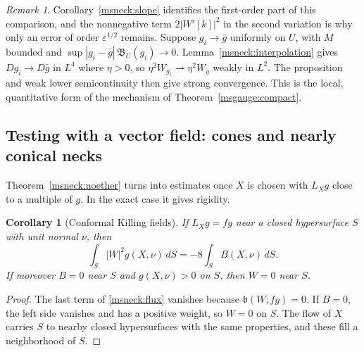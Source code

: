 \documentclass[11pt]{article}
\numberwithin{equation}{section}
\newtheorem{corollary}[theorem]{Corollary}
\theoremstyle{definition}
\theoremstyle{remark}
\newtheorem{remark}[theorem]{Remark}
\begin{document}
\begin{remark}\label{msneck:comparison-remark}
Corollary~\ref{msneck:slope} identifies the first-order part of this
comparison, and the nonnegative term \(2|W'[k]|^2\) in the second
variation is why only an error of order \(\varepsilon^{1/2}\) remains.
Suppose \(g_i\to\bar g\) uniformly on \(U\), with \(M\) bounded and
\(\sup|g_i-\bar g|\,\mathfrak B_U(g_i)\to0\). Lemma~\ref{msneck:interpolation}
gives \(Dg_i\to D\bar g\) in \(L^4\) where \(\eta>0\), so
\(\eta^2W_{g_i}\rightharpoonup\eta^2W_{\bar g}\) weakly in \(L^2\). The
proposition and weak lower semicontinuity then give strong convergence.
This is the local, quantitative form of the mechanism of
Theorem~\ref{msgauge:compact}.
\end{remark}

\subsection{Testing with a vector field: cones and nearly conical necks}
\label{msneck:conical}

Theorem~\ref{msneck:noether} turns into estimates once \(X\) is chosen
with \(L_Xg\) close to a multiple of \(g\). In the exact case it gives
rigidity.

\begin{corollary}[Conformal Killing fields]\label{msneck:ck}
If \(L_Xg=fg\) near a closed hypersurface \(S\) with unit normal \(\nu\),
then
\[
 \int_S|W|^2g(X,\nu)\,dS=-8\int_SB(X,\nu)\,dS .
\]
If moreover \(B=0\) near \(S\) and \(g(X,\nu)>0\) on \(S\), then \(W=0\)
near \(S\).
\end{corollary}

\begin{proof}
The last term of \eqref{msneck:flux} vanishes because \(\mathfrak b(W;fg)=0\).
If \(B=0\), the left side vanishes and has a positive weight, so \(W=0\)
on \(S\). The flow of \(X\) carries \(S\) to nearby closed hypersurfaces
with the same properties, and these fill a neighborhood of \(S\).
\end{proof}
\end{document}
